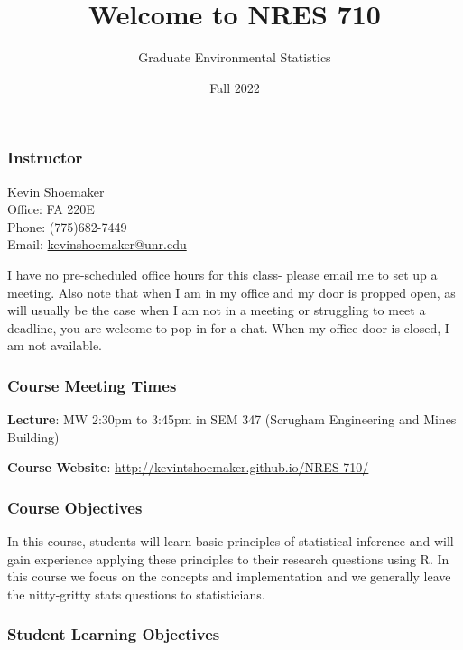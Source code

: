 \documentclass[
]{article}
\title{Welcome to NRES 710}
\author{Graduate Environmental Statistics}
\date{Fall 2022}
\begin{document}
\maketitle

\hypertarget{instructor}{%
\subsubsection{Instructor}\label{instructor}}

Kevin Shoemaker\\
Office: FA 220E\\
Phone: (775)682-7449\\
Email: \url{kevinshoemaker@unr.edu}

I have no pre-scheduled office hours for this class- please email me to
set up a meeting. Also note that when I am in my office and my door is
propped open, as will usually be the case when I am not in a meeting or
struggling to meet a deadline, you are welcome to pop in for a chat.
When my office door is closed, I am not available.

\hypertarget{course-meeting-times}{%
\subsubsection{Course Meeting Times}\label{course-meeting-times}}

\textbf{Lecture}: MW 2:30pm to 3:45pm in SEM 347 (Scrugham Engineering
and Mines Building)

\textbf{Course Website}:
\url{http://kevintshoemaker.github.io/NRES-710/}

\hypertarget{course-objectives}{%
\subsubsection{Course Objectives}\label{course-objectives}}

In this course, students will learn basic principles of statistical
inference and will gain experience applying these principles to their
research questions using R. In this course we focus on the concepts and
implementation and we generally leave the nitty-gritty stats questions
to statisticians.

\hypertarget{student-learning-objectives}{%
\subsubsection{Student Learning
Objectives}\label{student-learning-objectives}}
\end{document}

